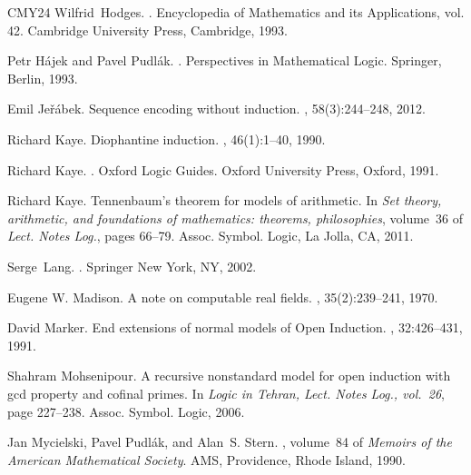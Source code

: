 \documentclass{amsart}
\begin{document}
\begin{thebibliography}{CMY24}
Wilfrid~Hodges.
.
\newblock Encyclopedia of Mathematics and its Applications, vol. 42. Cambridge
  University Press, Cambridge, 1993.

Petr H{\'a}jek and Pavel Pudl{\'a}k.
.
\newblock Perspectives in Mathematical Logic. Springer, Berlin, 1993.

Emil Je{\v{r}}{\'{a}}bek.
\newblock Sequence encoding without induction.
, 58(3):244--248, 2012.

Richard Kaye.
\newblock Diophantine induction.
, 46(1):1--40, 1990.

Richard Kaye.
.
\newblock Oxford Logic Guides. Oxford University Press, Oxford, 1991.

Richard Kaye.
\newblock Tennenbaum's theorem for models of arithmetic.
\newblock In {\em Set theory, arithmetic, and foundations of mathematics:
  theorems, philosophies}, volume~36 of {\em Lect. Notes Log.}, pages 66--79.
  Assoc. Symbol. Logic, La Jolla, CA, 2011.

Serge~Lang.
.
\newblock Springer New York, NY, 2002.

Eugene W. Madison.
\newblock A note on computable real fields.
, 35(2):239--241, 1970.

David Marker.
\newblock End extensions of normal models of {O}pen {I}nduction.
, 32:426--431, 1991.

Shahram Mohsenipour.
\newblock A recursive nonstandard model for open induction with gcd property
  and cofinal primes.
\newblock In {\em Logic in Tehran, Lect. Notes Log., vol.~26}, page 227–238.
  Assoc. Symbol. Logic, 2006.

Jan Mycielski, Pavel Pudl{\'a}k, and Alan~S. Stern.
, volume~84 of {\em Memoirs of the American Mathematical Society}.
\newblock AMS, Providence, Rhode Island, 1990.


\end{thebibliography}
\end{document}
